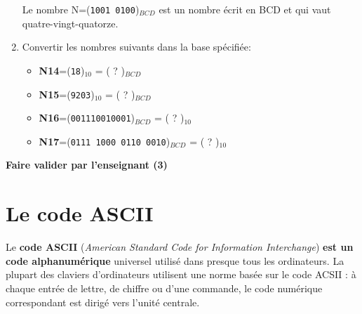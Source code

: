 \documentclass{article}
\begin{document}
\begin{enumerate}
\begin{minipage}[b]{.85\linewidth}
	Le nombre N=(\texttt{1001 0100})$_{BCD}$ est un nombre écrit en BCD et qui vaut quatre-vingt-quatorze.
\end{minipage}
	\item Convertir les nombres suivants dans la base spécifiée:
		\begin{itemize}
			\item \textbf{N14}=(\texttt{18})$_{10}$ = ( ? )$_{BCD}$\\
\vspace{1em}
\begin{Form}
	\TextField[name=r1714,width=\linewidth,height=2.5em,multiline=true,default=N14=]{}
\end{Form}
			\item \textbf{N15}=(\texttt{9203})$_{10}$ = ( ? )$_{BCD}$\\
\vspace{1em}
\begin{Form}
	\TextField[name=r1715,width=\linewidth,height=2.5em,multiline=true,default=N15=]{}
\end{Form}
			\item \textbf{N16}=(\texttt{001110010001})$_{BCD}$ = ( ? )$_{10}$\\
\vspace{1em}
\begin{Form}
	\TextField[name=r1716,width=\linewidth,height=2.5em,multiline=true,default=N16=]{}
\end{Form}
			\item \textbf{N17}=(\texttt{0111 1000 0110 0010})$_{BCD}$ = ( ? )$_{10}$\\
\vspace{1em}
\begin{Form}
	\TextField[name=r1717,width=\linewidth,height=2.5em,multiline=true,default=N17=]{}
\end{Form}
		\end{itemize}
\end{enumerate}

\begin{center}
	\vspace{2em}
	\Large
	\textbf{Faire valider par l'enseignant (3)}
\end{center}
\newpage
\section{Le code ASCII}
Le \textbf{code ASCII} (\emph{American Standard Code for Information Interchange}) \textbf{est un code alphanumérique} universel utilisé dans
presque tous les ordinateurs. La plupart des claviers d'ordinateurs utilisent une norme basée sur le code ACSII : à
chaque entrée de lettre, de chiffre ou d'une commande, le code numérique correspondant est dirigé vers l'unité centrale.
\end{document}
